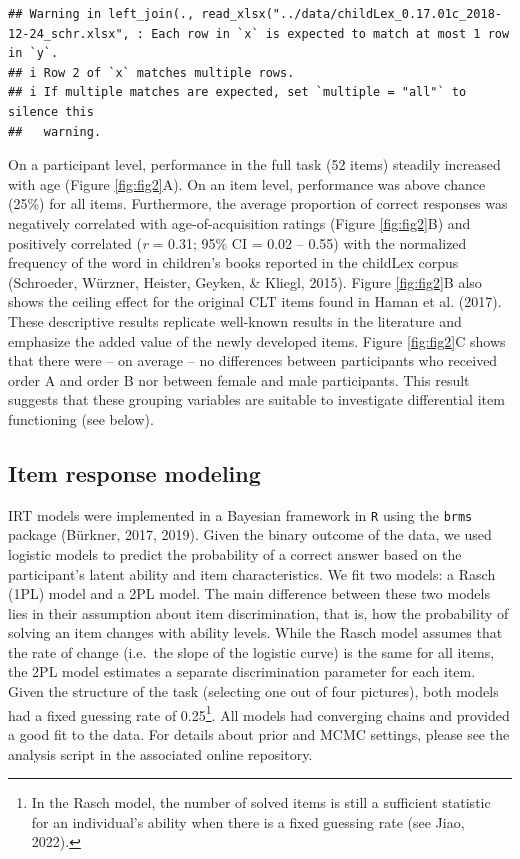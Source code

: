 \documentclass[
  man,floatsintext]{apa6}
\begin{document}
\begin{verbatim}
## Warning in left_join(., read_xlsx("../data/childLex_0.17.01c_2018-12-24_schr.xlsx", : Each row in `x` is expected to match at most 1 row in `y`.
## i Row 2 of `x` matches multiple rows.
## i If multiple matches are expected, set `multiple = "all"` to silence this
##   warning.
\end{verbatim}

On a participant level, performance in the full task (52 items) steadily increased with age (Figure \ref{fig:fig2}A). On an item level, performance was above chance (25\%) for all items. Furthermore, the average proportion of correct responses was negatively correlated with age-of-acquisition ratings (Figure \ref{fig:fig2}B) and positively correlated (\emph{r} = 0.31; 95\% CI = 0.02 -- 0.55) with the normalized frequency of the word in children's books reported in the childLex corpus (Schroeder, Würzner, Heister, Geyken, \& Kliegl, 2015). Figure \ref{fig:fig2}B also shows the ceiling effect for the original CLT items found in Haman et al. (2017). These descriptive results replicate well-known results in the literature and emphasize the added value of the newly developed items. Figure \ref{fig:fig2}C shows that there were -- on average -- no differences between participants who received order A and order B nor between female and male participants. This result suggests that these grouping variables are suitable to investigate differential item functioning (see below).

\hypertarget{item-response-modeling}{%
\subsection{Item response modeling}\label{item-response-modeling}}

IRT models were implemented in a Bayesian framework in \texttt{R} using the \texttt{brms} package (Bürkner, 2017, 2019). Given the binary outcome of the data, we used logistic models to predict the probability of a correct answer based on the participant's latent ability and item characteristics. We fit two models: a Rasch (1PL) model and a 2PL model. The main difference between these two models lies in their assumption about item discrimination, that is, how the probability of solving an item changes with ability levels. While the Rasch model assumes that the rate of change (i.e.~the slope of the logistic curve) is the same for all items, the 2PL model estimates a separate discrimination parameter for each item. Given the structure of the task (selecting one out of four pictures), both models had a fixed guessing rate of 0.25\footnote{In the Rasch model, the number of solved items is still a sufficient statistic for an individual's ability when there is a fixed guessing rate (see Jiao, 2022).}. All models had converging chains and provided a good fit to the data. For details about prior and MCMC settings, please see the analysis script in the associated online repository.
\end{document}
